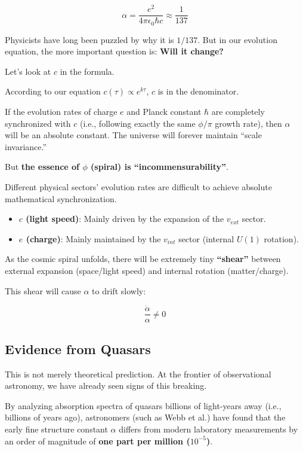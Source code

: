 \[\alpha = \frac{e^2}{4\pi \epsilon_0 \hbar c} \approx \frac{1}{137}\]

Physicists have long been puzzled by why it is $1/137$. But in our evolution equation, the more important question is: \textbf{Will it change?}

Let's look at $c$ in the formula.

According to our equation $c(\tau) \propto e^{k\tau}$, $c$ is in the denominator.

If the evolution rates of charge $e$ and Planck constant $\hbar$ are completely synchronized with $c$ (i.e., following exactly the same $\phi/\pi$ growth rate), then $\alpha$ will be an absolute constant. The universe will forever maintain ``scale invariance.''

But \textbf{the essence of $\phi$ (spiral) is ``incommensurability''}.

Different physical sectors' evolution rates are difficult to achieve absolute mathematical synchronization.

\begin{itemize}
\item \textbf{$c$ (light speed)}: Mainly driven by the expansion of the $v_{ext}$ sector.

\item \textbf{$e$ (charge)}: Mainly maintained by the $v_{int}$ sector (internal $U(1)$ rotation).
\end{itemize}

As the cosmic spiral unfolds, there will be extremely tiny \textbf{``shear''} between external expansion (space/light speed) and internal rotation (matter/charge).

This shear will cause $\alpha$ to drift slowly:

\[\frac{\dot{\alpha}}{\alpha} \neq 0\]

\subsection{Evidence from Quasars}

This is not merely theoretical prediction. At the frontier of observational astronomy, we have already seen signs of this breaking.

By analyzing absorption spectra of quasars billions of light-years away (i.e., billions of years ago), astronomers (such as Webb et al.) have found that the early fine structure constant $\alpha$ differs from modern laboratory measurements by an order of magnitude of \textbf{one part per million ($10^{-5}$)}.

